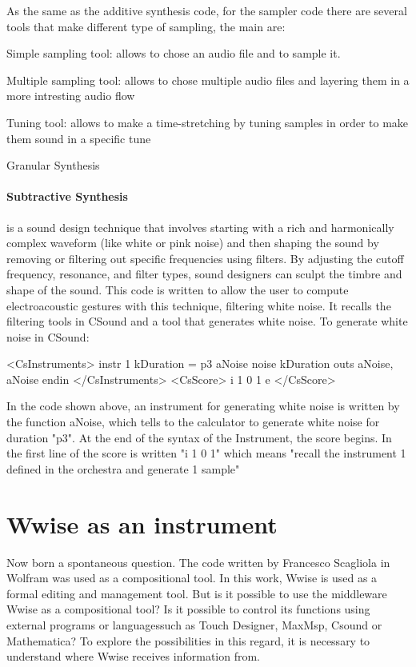 		As the same as the additive synthesis code, for the sampler code there are several tools that make different type of sampling, the main are:
		
			\begin{compactitem}
				\item Simple sampling tool: allows to chose an audio file and to sample it.
				\item Multiple sampling tool: allows to chose multiple audio files and layering them in a more intresting audio flow
				\item Tuning tool: allows to make a time-stretching by tuning samples in order to make them sound in a specific tune
				\item Granular Synthesis
			\end{compactitem}
		
		\paragraph{Subtractive Synthesis} is a sound design technique that involves starting with a rich and harmonically complex waveform (like white or pink noise) and then shaping the sound by removing or filtering out specific frequencies using filters. By adjusting the cutoff frequency, resonance, and filter types, sound designers can sculpt the timbre and shape of the sound.
		This code is written to allow the user to compute electroacoustic gestures with this technique, filtering white noise. It recalls the filtering tools in CSound and a tool that generates white noise. To generate white noise in CSound:
		
		\newpage
		
		\begin{code}
			<CsInstruments>
			instr 1
			kDuration = p3
			aNoise    noise kDuration
			outs aNoise, aNoise
			endin
			</CsInstruments>
			<CsScore>
			i 1 0 1
			e
			</CsScore>
		\end{code}
		
		In the code shown above, an instrument for generating white noise is written by the function aNoise, which tells to the calculator to generate white noise for duration "p3". At the end of the syntax of the Instrument, the score begins. In the first line of the score is written "i 1 0 1" which means "recall the instrument 1 defined in the orchestra and generate 1 sample"
		
	\section{Wwise as an instrument}
	Now born a spontaneous question. The code written by Francesco Scagliola in Wolfram was used as a compositional tool. In this work, Wwise is used as a formal editing and management tool.
	But is it possible to use the middleware Wwise as a compositional tool? Is it possible to control its functions using external programs or languages ​​such as Touch Designer, MaxMsp, Csound or Mathematica?
	To explore the possibilities in this regard, it is necessary to understand where Wwise receives information from.
	
